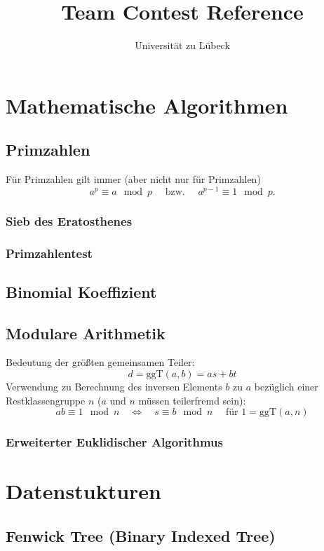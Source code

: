 \documentclass[10pt,a4paper,ngerman]{article}
\title{Team Contest Reference}
\author{Universität zu Lübeck}
\begin{document}
\lstset{basicstyle=\ttfamily\footnotesize,numbers=left,numberstyle=\tiny,tabsize=2,numbersep=5pt}
\maketitle

\section{Mathematische Algorithmen}
\subsection{Primzahlen}
Für Primzahlen gilt immer (aber nicht nur für Primzahlen)
\[a^p\equiv a\mod p \quad\text{ bzw. }\quad a^{p-1}\equiv 1 \mod p.\]
\subsubsection{Sieb des Eratosthenes}

\subsubsection{Primzahlentest}

\subsection{Binomial Koeffizient}

\subsection{Modulare Arithmetik}
Bedeutung der größten gemeinsamen Teiler:
\[ d = \text{ggT}(a,b) = as+bt \]
Verwendung zu Berechnung des inversen Elements $b$ zu $a$ bezüglich einer Restklassengruppe $n$ ($a$ und $n$ müssen teilerfremd sein):
\[ ab\equiv 1 \mod n\quad\Leftrightarrow\quad s\equiv b \mod n\quad\text{ für }1=\text{ggT}(a,n)\]
\subsubsection{Erweiterter Euklidischer Algorithmus}

\section{Datenstukturen}
\subsection{Fenwick Tree (Binary Indexed Tree)}

\end{document}
